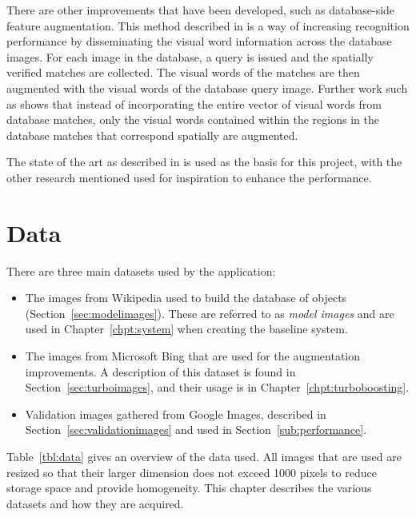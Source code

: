 \documentclass[11pt, onecolumn, a4paper, final]{report} %
\begin{document}
There are other improvements that have been developed, such as database-side feature augmentation. This method described in \cite{turcot09} is a way of  increasing recognition performance by disseminating the visual word information across the database images. For each image in the database, a query is issued and the spatially verified matches are collected. The visual words of the matches are then augmented with the visual words of the database query image. Further work such as \cite{rootsift12} shows that instead of incorporating the entire vector of visual words from database matches, only the visual words contained within the regions in the database matches that correspond spatially are augmented. 

The state of the art as described in \cite{philbin2007} is used as the basis for this project, with the other research mentioned used for inspiration to enhance the performance.

\chapter{Data}
\label{chpt:data}
There are three main datasets used by the application:

\begin{itemize}
\item The images from Wikipedia used to build the database of objects (Section~\ref{sec:modelimages}). These are referred to as \emph{model images} and are used in Chapter~\ref{chpt:system} when creating the baseline system.

\item The images from Microsoft Bing that are used for the augmentation improvements. A description of this dataset is found in Section~\ref{sec:turboimages}, and their usage is in Chapter~\ref{chpt:turboboosting}.

\item Validation images gathered from Google Images, described in Section~\ref{sec:validationimages} and used in Section~\ref{sub:performance}.
\end{itemize}

Table~\ref{tbl:data} gives an overview of the data used. All images that are used are resized so that their larger dimension does not exceed 1000 pixels to reduce storage space and provide homogeneity. This chapter describes the various datasets and how they are acquired. 
\end{document}
